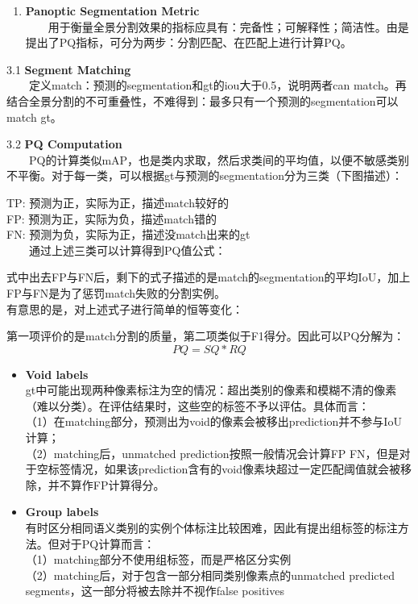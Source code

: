 \begin{enumerate}
\def\labelenumi{\arabic{enumi}.}
\setcounter{enumi}{2}
\item
  \textbf{Panoptic Segmentation Metric}\\
    用于衡量全景分割效果的指标应具有：完备性；可解释性；简洁性。由是提出了PQ指标，可分为两步：分割匹配、在匹配上进行计算PQ。
\end{enumerate}

3.1 \textbf{Segment Matching}\\
  定义match：预测的segmentation和gt的iou大于0.5，说明两者can
match。再结合全景分割的不可重叠性，不难得到：最多只有一个预测的segmentation可以match
gt。

3.2 \textbf{PQ Computation}\\
  PQ的计算类似mAP，也是类内求取，然后求类间的平均值，以便不敏感类别不平衡。对于每一类，可以根据gt与预测的segmentation分为三类（下图描述）：

TP: 预测为正，实际为正，描述match较好的\\
FP: 预测为正，实际为负，描述match错的\\
FN: 预测为负，实际为正，描述没match出来的gt\\
  通过上述三类可以计算得到PQ值公式：

式中出去FP与FN后，剩下的式子描述的是match的segmentation的平均IoU，加上FP与FN是为了惩罚match失败的分割实例。\\
有意思的是，对上述式子进行简单的恒等变化：

第一项评价的是match分割的质量，第二项类似于F1得分。因此可以PQ分解为：\\
\[PQ=SQ*RQ\]

\begin{itemize}
\item
  \textbf{Void labels}\\
  gt中可能出现两种像素标注为空的情况：超出类别的像素和模糊不清的像素（难以分类）。在评估结果时，这些空的标签不予以评估。具体而言：\\
  （1）在matching部分，预测出为void的像素会被移出prediction并不参与IoU计算；\\
  （2）matching后，unmatched prediction按照一般情况会计算FP
  FN，但是对于空标签情况，如果该prediction含有的void像素块超过一定匹配阈值就会被移除，并不算作FP计算得分。
\item
  \textbf{Group labels}\\
  有时区分相同语义类别的实例个体标注比较困难，因此有提出组标签的标注方法。但对于PQ计算而言：\\
  （1）matching部分不使用组标签，而是严格区分实例\\
  （2）matching后，对于包含一部分相同类别像素点的unmatched predicted
  segments，这一部分将被去除并不视作false positives
\end{itemize}

